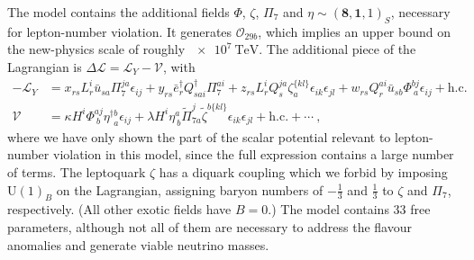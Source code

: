 The model contains the additional fields $\Phi$, $\zeta$, $\Pi_{7}$ and
$\eta \sim (\mathbf{8}, \mathbf{1}, 1)_{S}$, necessary for lepton-number
violation. It generates $\mathcal{O}_{29b}$, which implies an upper bound on the
new-physics scale of roughly $\SI{e7}{\TeV}$. The additional piece of the
Lagrangian is $\Delta \mathscr{L} = \mathscr{L}_{Y} - \mathcal{V}$, with
\begin{align}
  -\mathscr{L}_{Y} &= x_{rs} L^{i}_{r}\bar{u}_{sa} \Pi^{ja}_{7} \epsilon_{ij} +  y_{rs} \bar{e}^{\dagger}_{r} Q_{sai}^{\dagger} \Pi^{ai}_{7} + z_{rs}L^{i}_{r} Q^{ja}_{s} \zeta_{a}^{\{kl\}} \epsilon_{ik} \epsilon_{jl} + w_{rs} Q^{ai}_{r} \bar{u}_{sb} \Phi^{bj}_{\ a} \epsilon_{ij}  + \text{h.c.} \label{eq:flav-anom-yuks} \\
  \mathcal{V} &= \kappa H^{i} \Phi^{a j}_{\ b} \eta^{\dagger b}_{\ \ a} \epsilon_{ij} + \lambda H^{i} \eta^{a}_{\ b} \tilde{\Pi}^{j}_{7a} \tilde{\zeta}^{b \{kl\}} \epsilon_{ik}\epsilon_{jl} + \text{h.c.} + \cdots \ ,
\end{align}
where we have only shown the part of the scalar potential relevant to
lepton-number violation in this model, since the full expression contains a
large number of terms. The leptoquark $\zeta$ has a diquark coupling which we
forbid by imposing $\mathrm{U}(1)_{B}$ on the Lagrangian, assigning baryon
numbers of $-\tfrac{1}{3}$ and $\tfrac{1}{3}$ to $\zeta$ and $\Pi_{7}$,
respectively. (All other exotic fields have $B = 0$.) The model contains 33 free
parameters, although not all of them are necessary to address the flavour
anomalies and generate viable neutrino masses.

